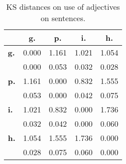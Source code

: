 \begin{table}[h!]
\begin{center}
\begin{tabular}{| l || c | c | c | c |}\hline
 & {\bf g.} & {\bf p.} & {\bf i.} & {\bf h.} \\\hline\hline
{\bf g.} & 0.000 & 1.161 & 1.021 & 1.054 \\
{\bf } & 0.000 & 0.053 & 0.032 & 0.028 \\\hline
{\bf p.} & 1.161 & 0.000 & 0.832 & 1.555 \\
{\bf } & 0.053 & 0.000 & 0.042 & 0.075 \\\hline
{\bf i.} & 1.021 & 0.832 & 0.000 & 1.736 \\
{\bf } & 0.032 & 0.042 & 0.000 & 0.060 \\\hline
{\bf h.} & 1.054 & 1.555 & 1.736 & 0.000 \\
{\bf } & 0.028 & 0.075 & 0.060 & 0.000 \\\hline
\end{tabular}
\caption{KS distances on use of adjectives on sentences.}
\end{center}
\end{table}